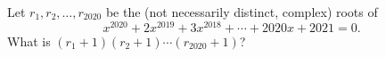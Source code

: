 Let $r_1,r_2,\dots,r_{2020}$ be the (not necessarily distinct, complex) roots of
\[
x^{2020}+2x^{2019}+3x^{2018}+\cdots+2020x+2021=0 .
\]
What is $(r_1+1)(r_2+1)\cdots(r_{2020}+1)$?
